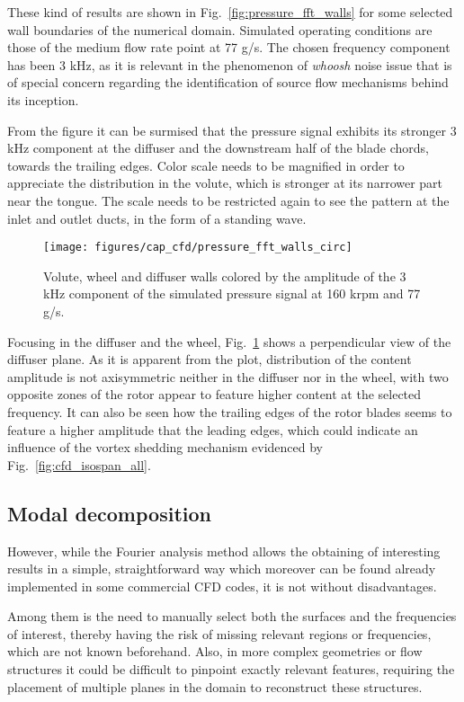 These kind of results are shown in Fig.~\ref{fig:pressure_fft_walls} for some selected wall boundaries of the numerical domain. Simulated operating conditions are those of the medium flow rate point at 77 g/s. The chosen frequency component has been 3 kHz, as it is relevant in the phenomenon of \emph{whoosh} noise issue that is of special concern regarding the identification of source flow mechanisms behind its inception.

From the figure it can be surmised that the pressure signal exhibits its stronger 3 kHz component at the diffuser and the downstream half of the blade chords, towards the trailing edges. Color scale needs to be magnified in order to appreciate the distribution in the volute, which is stronger at its narrower part near the tongue. The scale needs to be restricted again to see the pattern at the inlet and outlet ducts, in the form of a standing wave.

\begin{figure}[h!]
\centering
\texttt{[image: figures/cap\_cfd/pressure\_fft\_walls\_circ]}
\caption{Volute, wheel and diffuser walls colored by the amplitude of the 3 kHz component of the simulated pressure signal at 160 krpm and 77 g/s.}
\label{fig:pressure_fft_walls_circ}
\end{figure}

Focusing in the diffuser and the wheel, Fig.~\ref{fig:pressure_fft_walls_circ} shows a perpendicular view of the diffuser plane. As it is apparent from the plot, distribution of the content amplitude is not axisymmetric neither in the diffuser nor in the wheel, with two opposite zones of the rotor appear to feature higher content at the selected frequency. It can also be seen how the trailing edges of the rotor blades seems to feature a higher amplitude that the leading edges, which could indicate an influence of the vortex shedding mechanism evidenced by Fig.~\ref{fig:cfd_isospan_all}.

\subsection{Modal decomposition}

However, while the Fourier analysis method allows the obtaining of interesting results in a simple, straightforward way which moreover can be found already implemented in some commercial CFD codes, it is not without disadvantages.

Among them is the need to manually select both the surfaces and the frequencies of interest, thereby having the risk of missing relevant regions or frequencies, which are not known beforehand. Also, in more complex geometries or flow structures it could be difficult to pinpoint exactly relevant features, requiring the placement of multiple planes in the domain to reconstruct these structures.

